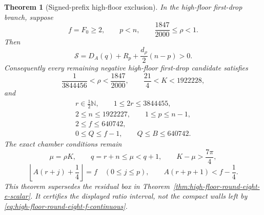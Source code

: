 \documentclass[11pt]{article}
\newtheorem{theorem}{Theorem}[section]
\theoremstyle{remark}
\newcommand{\N}{\mathbb N}
\begin{document}
\begin{theorem}[Signed-prefix high-floor exclusion]
\label{thm:high-floor-round-eight-f-scalar}
In the high-floor first-drop branch, suppose
\[
 f=F_0\geq2,\qquad p<n,\qquad
 \frac{1847}{2000}\leq\rho<1.
\]
Then
\begin{equation}
 \boxed{
 \mathcal S=D_A(q)+R_p+\frac{d_\rho}{2}(n-p)>0.}
 \label{eq:high-floor-round-eight-f-positive}
\end{equation}
Consequently every remaining negative high-floor first-drop candidate
satisfies
\begin{equation}
 \boxed{
 \frac1{3844456}<\rho<\frac{1847}{2000},\qquad
 \frac{21}{4}<K<1922228,}
 \label{eq:high-floor-round-eight-f-continuous}
\end{equation}
and
\begin{equation}
 \boxed{
 \begin{gathered}
 r\in\tfrac12\N,\qquad 1\leq2r\leq3844455,\\
 2\leq n\leq1922227,\qquad 1\leq p\leq n-1,\\
 2\leq f\leq640742,\\
 0\leq Q\leq f-1,\qquad Q\leq B\leq640742.
 \end{gathered}}
 \label{eq:high-floor-round-eight-f-discrete}
\end{equation}
The exact chamber conditions remain
\begin{equation}
 \mu=\rho K,\qquad q=r+n\leq\mu<q+1,\qquad
 K-\mu>\frac{7\pi}{4},
 \label{eq:high-floor-round-eight-f-chamber-one}
\end{equation}
\begin{equation}
 \left\lfloor A(r+j)+\frac14\right\rfloor=f
 \quad(0\leq j\leq p),\qquad
 A(r+p+1)<f-\frac14.
 \label{eq:high-floor-round-eight-f-chamber-two}
\end{equation}
This theorem supersedes the residual box in
Theorem~\ref{thm:high-floor-round-eight-e-scalar}.  It certifies the
displayed ratio interval, not the compact walls left by
\eqref{eq:high-floor-round-eight-f-continuous}.
\end{theorem}
\end{document}
